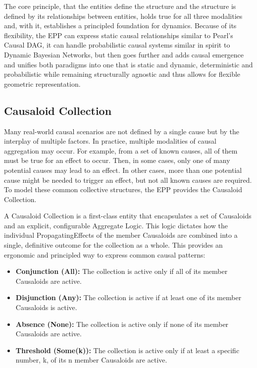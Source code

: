 The core principle, that the entities define the structure and the structure is defined by its relationships between entities, holds true for all three modalities and, with it, establishes a principled foundation for dynamics. Because of its flexibility, the EPP can express static causal relationships similar to Pearl’s Causal DAG, it can handle probabilistic causal systems similar in spirit to Dynamic Bayesian Networks, but then goes further and  adds causal emergence and unifies both paradigms into one that is static and dynamic, deterministic and probabilistic while remaining structurally agnostic and thus allows for flexible geometric representation.

%
%
\subsection{Causaloid Collection}
\label{sec:epp_causaloid_collection}


Many real-world causal scenarios are not defined by a single cause but by the interplay of multiple factors. In practice, multiple modalities of causal aggregation may occur. For example, from a set of known causes, all of them must be true for an effect to occur. Then, in some cases, only one of many potential causes may lead to an effect. In other cases, more than one potential cause might be needed to trigger an effect, but not all known causes are required. To model these common collective structures, the EPP provides the Causaloid Collection.

A Causaloid Collection is a first-class entity that encapsulates a set of Causaloids and an explicit, configurable Aggregate Logic. This logic dictates how the individual PropagatingEffects of the member Causaloids are combined into a single, definitive outcome for the collection as a whole. This provides an ergonomic and principled way to express common causal patterns:

\begin{itemize}
\item \textbf{Conjunction (All):} The collection is active only if all of its member Causaloids are active.
\item \textbf{Disjunction (Any):} The collection is active if at least one of its member Causaloids is active.
\item \textbf{Absence (None):} The collection is active only if none of its member Causaloids are active.
\item \textbf{Threshold (Some(k)):} The collection is active only if at least a specific number, k, of its n member Causaloids are active.
\end{itemize}

